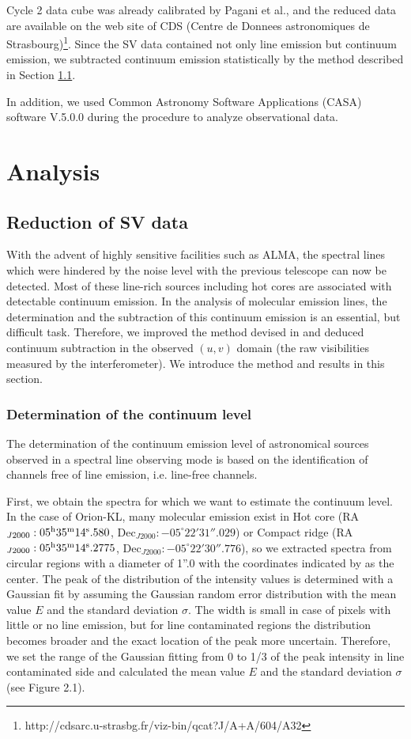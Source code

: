 Cycle 2 data cube was already calibrated by Pagani et al., and the reduced data are available on 
the web site of CDS (Centre de Donnees astronomiques de Strasbourg)\footnote{http://cdsarc.u-strasbg.fr/viz-bin/qcat?J/A+A/604/A32}.
Since the SV data contained not only line emission but continuum emission, 
we subtracted continuum emission statistically by the method described in Section \ref{sec:Statcont}.

In addition, we used Common Astronomy Software Applications (CASA) software V.5.0.0 \citep{McMullin+2007} during the procedure to analyze observational data.

\newpage
\section{Analysis}
\subsection{Reduction of SV data}
\label{sec:Statcont}

With the advent of highly sensitive facilities such as ALMA, the spectral lines which were hindered 
by the noise level with the previous telescope can now be detected.
Most of these line-rich sources including hot cores are associated with detectable continuum emission.
In the analysis of molecular emission lines, the determination and the subtraction of this continuum 
emission is an essential, but difficult task. 
Therefore, we improved the method devised in \citet{Sanchez-Monge+2017} and deduced continuum subtraction 
in the observed $(u,v)$ domain (the raw visibilities measured by the interferometer).
We introduce the method and results in this section.

\subsubsection*{Determination of the continuum level}
The determination of the continuum emission level of astronomical sources observed in a spectral line 
observing mode is based on the identification of channels free of line emission, i.e. line-free channels.

First, we obtain the spectra for which we want to estimate the continuum level.  
In the case of Orion-KL, many molecular emission exist in Hot core
(RA$_{J2000}: 05^{\rm{h}}35^{\rm{m}}14^{\rm{s}}.580$, Dec$_{J2000}:-05^{\circ}22'31''.029$) or 
Compact ridge (RA$_{J2000}: 05^{\rm{h}}35^{\rm{m}}14^{\rm{s}}.2775$, Dec$_{J2000}:-05^{\circ}22'30''.776$), 
so we extracted spectra from circular regions with a diameter of 1''.0  with the coordinates indicated by 
\citet{Hirota+2015} as the center.
The peak of the distribution of the intensity values is determined with a Gaussian fit 
by assuming the Gaussian random error distribution with the mean value $E$ and the standard deviation $\sigma$.
The width is small in case of pixels with little or no line emission, but for line contaminated 
regions the distribution becomes broader and the exact location of the peak more uncertain. 
Therefore, we set the range of the Gaussian fitting from 0 to 1/3 of the peak intensity in line contaminated side 
and calculated the mean value $E$ and the standard deviation $\sigma$ (see Figure 2.1). 

